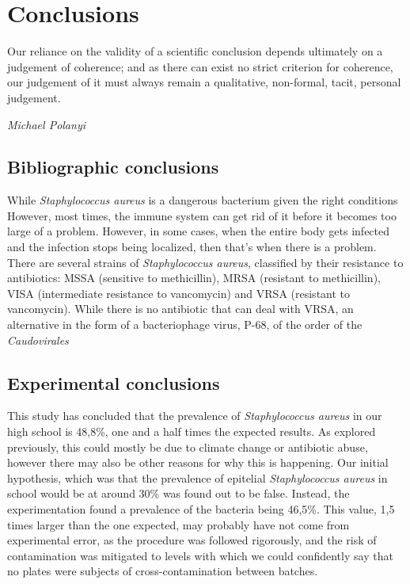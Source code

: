 \chapter{Conclusions}
\epigraph{Our reliance on the validity of a scientific conclusion depends ultimately on a judgement of coherence; and as there can exist no strict criterion for coherence, our judgement of it must always remain a qualitative, non-formal, tacit, personal judgement.}{\textit{Michael Polanyi}}
\section{Bibliographic conclusions}
While \emph{Staphylococcus aureus} is a dangerous bacterium given the right conditions However, most times, the immune system can get rid of it before it becomes too large of a problem. However, in some cases, when the entire body gets infected and the infection stops being localized, then that's when there is a problem. There are several strains of \emph{Staphylococcus aureus}, classified by their resistance to antibiotics: MSSA (sensitive to methicillin), MRSA (resistant to methicillin), VISA (intermediate resistance to vancomycin) and VRSA (resistant to vancomycin). While there is no antibiotic that can deal with VRSA, an alternative in the form of a bacteriophage virus, P-68, of the order of the \emph{Caudovirales}
\section{Experimental conclusions}
This study has concluded that the prevalence of \emph{Staphylococcus aureus} in our high school is 48,8\%, one and a half times the expected results. As explored previously, this could mostly be due to climate change or antibiotic abuse, however there may also be other reasons for why this is happening. Our initial hypothesis, which was that the prevalence of epitelial \emph{Staphylococcus aureus} in school would be at around 30\% was found out to be false. Instead, the experimentation found a prevalence of the bacteria being 46,5\%. This value, 1,5 times larger than the one expected, may probably have not come from experimental error, as the procedure was followed rigorously, and the risk of contamination was mitigated to levels with which we could confidently say that no plates were subjects of cross-contamination between batches.\newline
